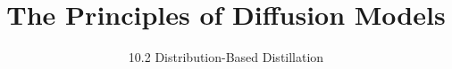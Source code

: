 
\title{The Principles of Diffusion Models}
\subtitle{10.2 Distribution-Based Distillation}


\begin{frame}
    \titlepage
\end{frame}


